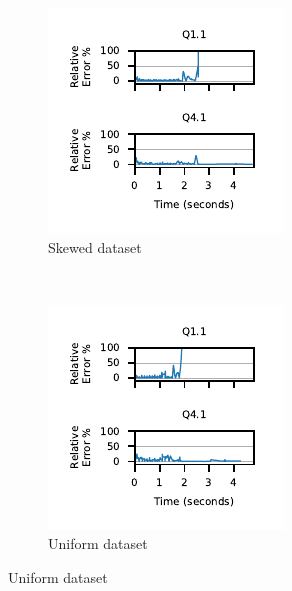 \begin{figure}[t]
	\centering
	\label{fig:pred-vs-observed-time-per-wo}
    \begin{subfigure}[b]{0.3\textwidth}
    	\includegraphics[width=\textwidth]{policy/figures/q11-q41-prediction-accuracy-skew-data.pdf}
	\caption{Skewed dataset}    	
    \end{subfigure}%
	~    
    \begin{subfigure}[b]{0.3\textwidth}
    	\includegraphics[width=\textwidth]{policy/figures/q11-q41-prediction-accuracy-uniform-data.pdf}
	\caption{Uniform dataset}    	    	
    \end{subfigure}%
\end{figure}

